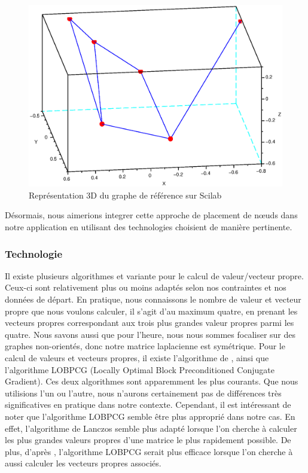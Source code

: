 \documentclass[a4paper, 11pt]{article}
\begin{document}
\begin{figure}[ht]
  \begin{center}
    \includegraphics[scale=0.4]{contents/grefsci}
  \end{center}
  \caption{Représentation 3D du graphe de référence sur Scilab}
  \label{fig:G3D}
\end{figure}

Désormais, nous aimerions integrer cette approche de placement de nœuds dans notre application en utilisant des technologies choisient de manière pertinente.

\subsubsection{Technologie}

Il existe plusieurs algorithmes et variante pour le calcul de valeur/vecteur propre. Ceux-ci sont relativement plus ou moins adaptés selon nos contraintes et nos données de départ. En pratique, nous connaissons le nombre de valeur et vecteur propre que nous voulons calculer, il s'agit d'au maximum quatre, en prenant les vecteurs propres correspondant aux trois plus grandes valeur propres parmi les quatre. Nous savons aussi que pour l'heure, nous nous sommes focaliser sur des graphes non-orientés, donc notre matrice laplacienne est symétrique. Pour le calcul de valeurs et vecteurs propres, il existe l'algorithme de , ainsi que l'algorithme LOBPCG (Locally Optimal Block Preconditioned Conjugate Gradient). Ces deux algorithmes sont apparemment les plus courants. Que nous utilisions l'un ou l'autre, nous n'aurons certainement pas de différences très significatives en pratique dans notre contexte. Cependant, il est intéressant de noter que l'algorithme LOBPCG semble être plus approprié dans notre cas. En effet, l'algorithme de Lanczos semble plus adapté lorsque l'on cherche à calculer les plus grandes valeurs propres d'une matrice le plus rapidement possible. De plus, d'après \cite{lobpcg}, l'algorithme LOBPCG serait plus efficace lorsque l'on cherche à aussi calculer les vecteurs propres associés.
\end{document}

